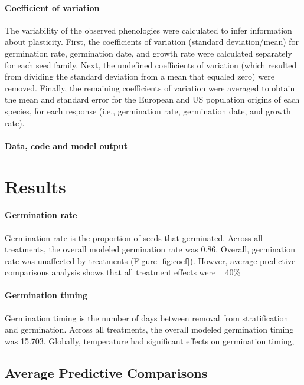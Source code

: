 \documentclass[12pt]{article}\usepackage[]{graphicx}\usepackage[]{color}
\begin{document}
	\paragraph{Coefficient of variation} The variability of the observed phenologies were calculated to infer information about plasticity. First, the coefficients of variation (standard deviation/mean) for germination rate, germination date, and growth rate were calculated separately for each seed family. Next, the undefined coefficients of variation (which resulted from dividing the standard deviation from a mean that equaled zero) were removed. Finally, the remaining coefficients of variation were averaged to obtain the mean and standard error for the European and US population origins of each species, for each response (i.e., germination rate, germination date, and growth rate). 
	
	\paragraph{Data, code and model output} 
	\section{Results}
	\paragraph{Germination rate} Germination rate is the proportion of seeds that germinated. Across all treatments, the overall modeled germination rate was 0.86. Overall, germination rate was unaffected by treatments (Figure \ref{fig:coef}). Howver, average predictive comparisons analysis shows that all treatment effects were ~ 40\% 
	\paragraph{Germination timing} Germination timing is the number of days between removal from stratification and germination. Across all treatments, the overall modeled germination timing was 15.703. Globally, temperature had significant effects on germination timing, 
	\subsection{Average Predictive Comparisons}
\end{document}
